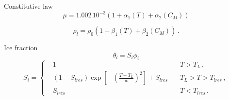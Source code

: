 \documentclass{beamer}
\begin{document}
\begin{frame}{Constitutive law}
		\begin{equation*}
			\mu=1.002\, 10^{-3} \left( 1+ \alpha_1(T) +\alpha_2(C_M) \right)
		\end{equation*}
		 
		\begin{equation*}
			\rho_l =  \rho_0(1+\beta_1(T)+ \beta_2(C_M) )\, .
			\label{consrho}
		\end{equation*}
\end{frame}
\begin{frame}{Ice fraction}
\begin{equation*}
\theta_l =S_i \phi_i
\end{equation*} 
\begin{equation*}
S_i=\left\{
\begin{aligned}
&1 \quad & T > T_L \,,\\
&(1-S_{lres})\exp\left[ - \left( \frac{T-T_L}{w}\right)^2 \right] +
S_{lres} \quad & T_L> T > T_{lres}\,,\\
&S_{lres}  \quad &  T < T_{lres}\,.
\end{aligned}
\right.
\end{equation*}
\end{frame}
\end{document}
